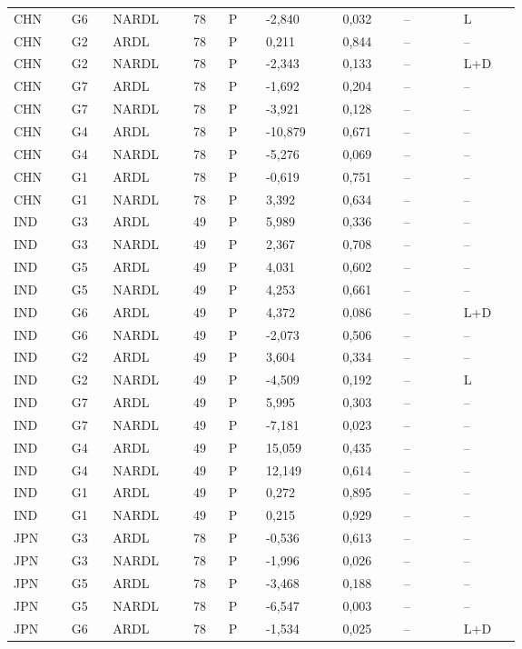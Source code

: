 {\begin{longtable}{p{0.075\linewidth}p{0.05\linewidth}p{0.09\linewidth}p{0.04\linewidth}p{0.05\linewidth}p{0.1\linewidth}p{0.085\linewidth}p{0.085\linewidth}p{0.075\linewidth}}
CHN & G6 & NARDL & 78 & P & -2,840 & 0,032 & -- & L\\
CHN & G2 & ARDL & 78 & P & 0,211 & 0,844 & -- & --\\
CHN & G2 & NARDL & 78 & P & -2,343 & 0,133 & -- & L+D\\
CHN & G7 & ARDL & 78 & P & -1,692 & 0,204 & -- & --\\
CHN & G7 & NARDL & 78 & P & -3,921 & 0,128 & -- & --\\
CHN & G4 & ARDL & 78 & P & -10,879 & 0,671 & -- & --\\
CHN & G4 & NARDL & 78 & P & -5,276 & 0,069 & -- & --\\
CHN & G1 & ARDL & 78 & P & -0,619 & 0,751 & -- & --\\
CHN & G1 & NARDL & 78 & P & 3,392 & 0,634 & -- & --\\
IND & G3 & ARDL & 49 & P & 5,989 & 0,336 & -- & --\\
IND & G3 & NARDL & 49 & P & 2,367 & 0,708 & -- & --\\
IND & G5 & ARDL & 49 & P & 4,031 & 0,602 & -- & --\\
IND & G5 & NARDL & 49 & P & 4,253 & 0,661 & -- & --\\
IND & G6 & ARDL & 49 & P & 4,372 & 0,086 & -- & L+D\\
IND & G6 & NARDL & 49 & P & -2,073 & 0,506 & -- & --\\
IND & G2 & ARDL & 49 & P & 3,604 & 0,334 & -- & --\\
IND & G2 & NARDL & 49 & P & -4,509 & 0,192 & -- & L\\
IND & G7 & ARDL & 49 & P & 5,995 & 0,303 & -- & --\\
IND & G7 & NARDL & 49 & P & -7,181 & 0,023 & -- & --\\
IND & G4 & ARDL & 49 & P & 15,059 & 0,435 & -- & --\\
IND & G4 & NARDL & 49 & P & 12,149 & 0,614 & -- & --\\
IND & G1 & ARDL & 49 & P & 0,272 & 0,895 & -- & --\\
IND & G1 & NARDL & 49 & P & 0,215 & 0,929 & -- & --\\
JPN & G3 & ARDL & 78 & P & -0,536 & 0,613 & -- & --\\
JPN & G3 & NARDL & 78 & P & -1,996 & 0,026 & -- & --\\
JPN & G5 & ARDL & 78 & P & -3,468 & 0,188 & -- & --\\
JPN & G5 & NARDL & 78 & P & -6,547 & 0,003 & -- & --\\
JPN & G6 & ARDL & 78 & P & -1,534 & 0,025 & -- & L+D\\

\end{longtable}}
